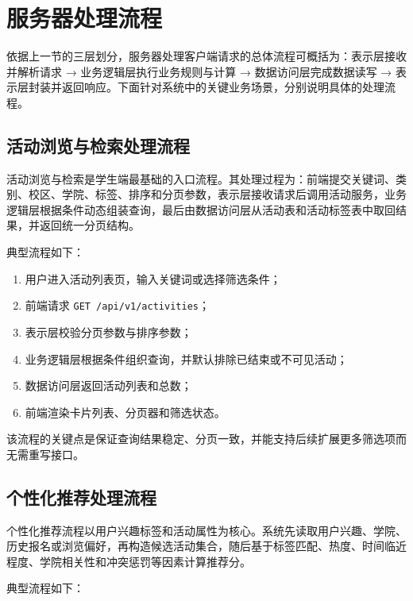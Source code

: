 \documentclass[UTF8,a4paper,12pt,fontset=none]{ctexrep}
\providecommand{\tightlist}{}
\begin{document}
\section{服务器处理流程}\label{ux670dux52a1ux5668ux5904ux7406ux6d41ux7a0b}

依据上一节的三层划分，服务器处理客户端请求的总体流程可概括为：表示层接收并解析请求 → 业务逻辑层执行业务规则与计算 → 数据访问层完成数据读写 → 表示层封装并返回响应。下面针对系统中的关键业务场景，分别说明具体的处理流程。

\subsection{活动浏览与检索处理流程}\label{ux6d3bux52a8ux6d4fux89c8ux4e0eux68c0ux7d22ux5904ux7406ux6d41ux7a0b}

活动浏览与检索是学生端最基础的入口流程。其处理过程为：前端提交关键词、类别、校区、学院、标签、排序和分页参数，表示层接收请求后调用活动服务，业务逻辑层根据条件动态组装查询，最后由数据访问层从活动表和活动标签表中取回结果，并返回统一分页结构。

典型流程如下：

\begin{enumerate}
\def\labelenumi{\arabic{enumi}.}
\tightlist
\item
  用户进入活动列表页，输入关键词或选择筛选条件；
\item
  前端请求 \texttt{GET\ /api/v1/activities}；
\item
  表示层校验分页参数与排序参数；
\item
  业务逻辑层根据条件组织查询，并默认排除已结束或不可见活动；
\item
  数据访问层返回活动列表和总数；
\item
  前端渲染卡片列表、分页器和筛选状态。
\end{enumerate}

该流程的关键点是保证查询结果稳定、分页一致，并能支持后续扩展更多筛选项而无需重写接口。

\subsection{个性化推荐处理流程}\label{ux4e2aux6027ux5316ux63a8ux8350ux5904ux7406ux6d41ux7a0b}

个性化推荐流程以用户兴趣标签和活动属性为核心。系统先读取用户兴趣、学院、历史报名或浏览偏好，再构造候选活动集合，随后基于标签匹配、热度、时间临近程度、学院相关性和冲突惩罚等因素计算推荐分。

典型流程如下：
\end{document}
